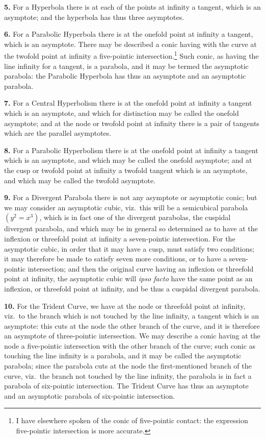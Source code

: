 \documentclass[11pt,a4paper]{article}
\begin{document}
\textbf{5.} For a Hyperbola there is at each of the points at infinity a tangent, which is an asymptote; and the hyperbola has thus three asymptotes.

\medskip

\textbf{6.} For a Parabolic Hyperbola there is at the onefold point at infinity a tangent, which is an asymptote. There may be described a conic having with the curve at the twofold point at infinity a five-pointic intersection.\footnote{I have elsewhere spoken of the conic of five-pointic contact: the expression five-pointic intersection is more accurate.} Such conic, as having the line infinity for a tangent, is a parabola, and it may be termed the asymptotic parabola: the Parabolic Hyperbola has thus an asymptote and an asymptotic parabola.

\medskip

\textbf{7.} For a Central Hyperbolism there is at the onefold point at infinity a tangent which is an asymptote, and which for distinction may be called the onefold asymptote; and at the node or twofold point at infinity there is a pair of tangents which are the parallel asymptotes.

\medskip

\textbf{8.} For a Parabolic Hyperbolism there is at the onefold point at infinity a tangent which is an asymptote, and which may be called the onefold asymptote; and at the cusp or twofold point at infinity a twofold tangent which is an asymptote, and which may be called the twofold asymptote.

\medskip

\textbf{9.} For a Divergent Parabola there is not any asymptote or asymptotic conic; but we may consider an asymptotic cubic, viz.\ this will be a semicubical parabola $(y^{2}=x^{3})$, which is in fact one of the divergent parabolas, the cuspidal divergent parabola, and which may be in general so determined as to have at the inflexion or threefold point at infinity a seven-pointic intersection. For the asymptotic cubic, in order that it may have a cusp, must satisfy two conditions; it may therefore be made to satisfy seven more conditions, or to have a seven-pointic intersection; and then the original curve having an inflexion or threefold point at infinity, the asymptotic cubic will \emph{ipso facto} have the same point as an inflexion, or threefold point at infinity, and be thus a cuspidal divergent parabola.

\medskip

\textbf{10.} For the Trident Curve, we have at the node or threefold point at infinity, viz.\ to the branch which is not touched by the line infinity, a tangent which is an asymptote: this cuts at the node the other branch of the curve, and it is therefore an asymptote of three-pointic intersection. We may describe a conic having at the node a five-pointic intersection with the other branch of the curve; such conic as touching the line infinity is a parabola, and it may be called the asymptotic parabola; since the parabola cuts at the node the first-mentioned branch of the curve, viz.\ the branch not touched by the line infinity, the parabola is in fact a parabola of six-pointic intersection. The Trident Curve has thus an asymptote and an asymptotic parabola of six-pointic intersection.
\end{document}
